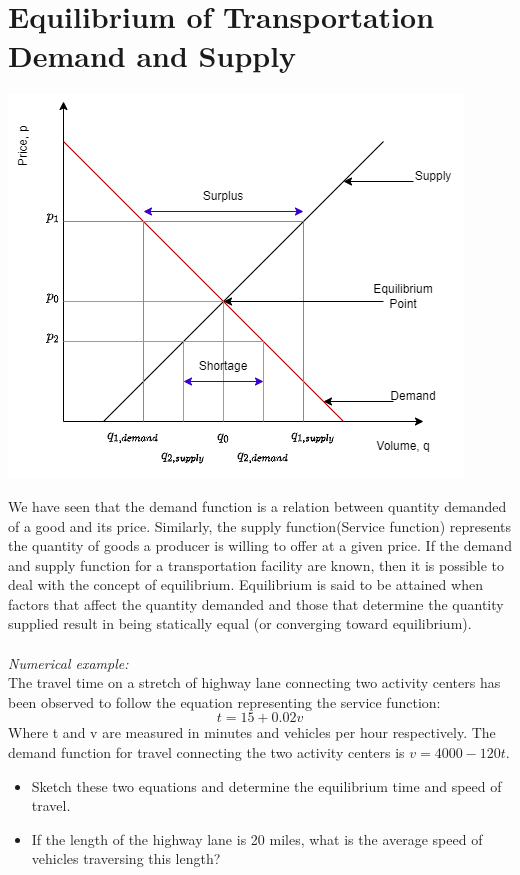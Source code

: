 \section{Equilibrium of Transportation Demand and Supply}
\begin{center}
	\includegraphics[scale=0.5]{gfx/fig44.png}
\end{center}
We have seen that the demand function is a relation between quantity demanded of a good and its price. Similarly, the supply function(Service function) represents the quantity of goods a producer is willing to offer at a given price. If the demand and supply function for a transportation facility are known, then it is possible to deal with the concept of equilibrium. Equilibrium is said to be attained when factors that affect the quantity demanded and those that determine the quantity supplied result in being statically equal (or converging toward equilibrium).\\\\
\textit{Numerical example:}\\
The travel time on a stretch of highway lane connecting two activity centers has been observed to follow the equation representing the service function:
$$ t = 15 + 0.02 v $$
Where t and v are measured in minutes and vehicles per hour respectively. The demand function for travel connecting the two activity centers is $ v = 4000 - 120t $.
\begin{itemize}
	\item Sketch these two equations and determine the equilibrium time and speed of travel.
	\item If the length of the highway lane is 20 miles, what is the average speed of vehicles traversing this length?
\end{itemize}
